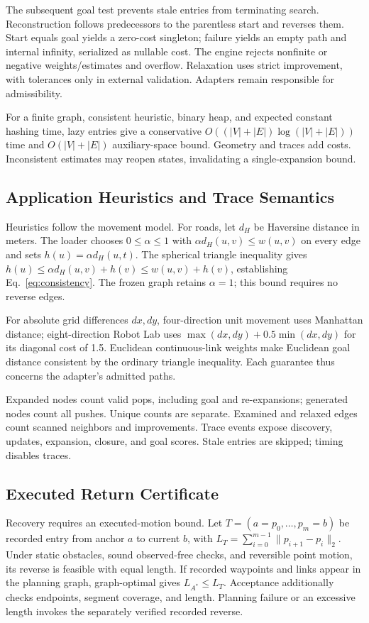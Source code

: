 The subsequent goal test prevents stale entries from terminating search. Reconstruction follows predecessors to the parentless start and reverses them. Start equals goal yields a zero-cost singleton; failure yields an empty path and internal infinity, serialized as nullable cost. The engine rejects nonfinite or negative weights/estimates and overflow. Relaxation uses strict improvement, with tolerances only in external validation. Adapters remain responsible for admissibility.

For a finite graph, consistent heuristic, binary heap, and expected constant hashing time, lazy entries give a conservative $O((|V|+|E|)\log(|V|+|E|))$ time and $O(|V|+|E|)$ auxiliary-space bound. Geometry and traces add costs. Inconsistent estimates may reopen states, invalidating a single-expansion bound.

\subsection{Application Heuristics and Trace Semantics}
Heuristics follow the movement model. For roads, let $d_H$ be Haversine distance in meters. The loader chooses $0\leq\alpha\leq1$ with $\alpha d_H(u,v)\leq w(u,v)$ on every edge and sets $h(u)=\alpha d_H(u,t)$. The spherical triangle inequality gives $h(u)\leq\alpha d_H(u,v)+h(v)\leq w(u,v)+h(v)$, establishing Eq.~\ref{eq:consistency}. The frozen graph retains $\alpha=1$; this bound requires no reverse edges.

For absolute grid differences $dx,dy$, four-direction unit movement uses Manhattan distance; eight-direction Robot Lab uses $\max(dx,dy)+0.5\min(dx,dy)$ for its diagonal cost of 1.5. Euclidean continuous-link weights make Euclidean goal distance consistent by the ordinary triangle inequality. Each guarantee thus concerns the adapter's admitted paths.

Expanded nodes count valid pops, including goal and re-expansions; generated nodes count all pushes. Unique counts are separate. Examined and relaxed edges count scanned neighbors and improvements. Trace events expose discovery, updates, expansion, closure, and goal scores. Stale entries are skipped; timing disables traces.

\subsection{Executed Return Certificate}
Recovery requires an executed-motion bound. Let $T=(a=p_0,\ldots,p_m=b)$ be recorded entry from anchor $a$ to current $b$, with $L_T=\sum_{i=0}^{m-1}\|p_{i+1}-p_i\|_2$. Under static obstacles, sound observed-free checks, and reversible point motion, its reverse is feasible with equal length. If recorded waypoints and links appear in the planning graph, graph-optimal \astar{} gives $L_{A^*}\leq L_T$. Acceptance additionally checks endpoints, segment coverage, and length. Planning failure or an excessive length invokes the separately verified recorded reverse.

